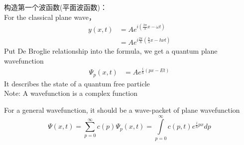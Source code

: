 \begin{frame}
    \frametitle{}
    构造第一个波函数(平面波函数)：~\\
    For the classical plane wave，
        \begin{equation*}
            \begin{split}
                y(x,t)&=A e^{i(\frac{2\pi}{\lambda}x-\omega t)} \\
                    & = A e^{i\frac{2\pi}{h}(\frac{h}{\lambda}x-h\nu t)}
            \end{split} 
        \end{equation*}
        Put De Broglie relationship into the formula, we get a quantum plane wavefunction
        \begin{equation*}
            \begin{split}
                \Psi_p(x,t)&=A e^{\frac{i}{\hbar}(px-Et)}
            \end{split} 
         \end{equation*}
         It describes the state of a quantum free particle\\
         \alert{Note:} A wavefunction is a complex function 
\end{frame}

\begin{frame}
         For a general wavefunction, it should be a wave-packet of plane wavefunction
         \begin{equation*}
                \Psi(x,t)=\sum\limits_{p=0} ^{\infty} c(p)\Psi_p(x,t) = \int\limits_{p=0} ^{\infty} c(p,t) e^{\frac{i}{\hbar}px}dp
         \end{equation*}
\end{frame}


